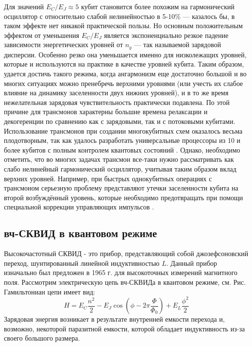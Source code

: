 Для значений $E_C/E_J \approx 5$ кубит становится более похожим на гармонический осциллятор с относительно слабой нелинейностью в 5-10\% --- казалось бы, в таком эффекте нет никакой практической пользы. Но основным положительным эффектом от уменьшения $E_C/E_J$ является экспоненциально резкое падение зависимости энергетических уровней от $n_g$ --- так называемой зарядовой дисперсии. Особенно резко она уменьшается именно для низколежащих уровней, которые и используются на практике в качестве уровней кубита. Таким образом, удается достичь такого режима, когда ангармонизм еще достаточно большой и во многих ситуациях можно пренебречь верхними уровнями (или учесть их слабое влияние на динамику заселенности двух нижних уровней), и в то же время нежелательная зарядовая чувствительность практически подавлена. По этой причине для трансмонов характерны большие времена релаксации и декогеренции \cite{place2021new} по сравнению как с зарядовыми, так и с потоковыми кубитами. Использование трансмонов при создании многокубитных схем оказалось весьма плодотворным, так как удалось разработать универсальные процессоры из 10 и более кубитов с полным контролем квантовых состояний \cite{kelly2015state,PhysRevLett.119.180511}. Однако, необходимо отметить, что во многих задачах трансмон все-таки нужно рассматривать как слабо нелинейный гармонический осциллятор, учитывая таким образом вклад верхних уровней. Например, при быстрых однокубитных операциях с трансмоном серьезную проблему представляют утечки заселенности кубита на второй возбуждённый уровень, которые необходимо предотвращать при помощи специальной коррекции управляющих импульсов \cite{chen2016measuring}. 

\subsection{вч-СКВИД в квантовом режиме}
Высокочастотный СКВИД - это прибор, представляющий собой джозефсоновский переход, шунтированный линейной индуктивностью $L$. Данный прибор изначально был предложен в 1965 г. для высокоточных измерений магнитного поля. Рассмотрим электрическую цепь вч-СКВИДа в квантовом режиме, см. Рис. Гамильтониан цепи имеет вид:
\begin{equation}
H = E_C \frac{n^2}{2} - E_J\cos(\phi - 2\pi\frac{\Phi}{\Phi_0}) + E_L\frac{\phi^2}{2}
\label{eq: rf_squid_ham}
\end{equation}
Зарядовая энергия возникает в результате внутренней емкости перехода и, возможно, некоторой паразитной емкости, которой обладает индуктивность из-за своего большого размера.

